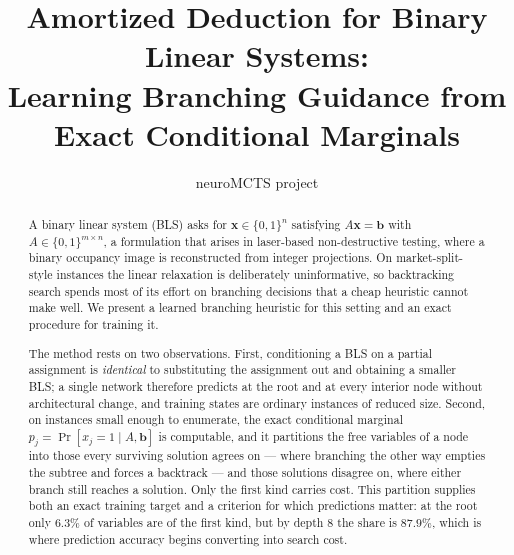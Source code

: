 \documentclass[preprint,12pt]{elsarticle}
\begin{document}
\begin{frontmatter}

\title{Amortized Deduction for Binary Linear Systems:\\
Learning Branching Guidance from Exact Conditional Marginals}

\author[1]{neuroMCTS project}

\begin{abstract}
A binary linear system (BLS) asks for $\mathbf{x}\in\{0,1\}^n$ satisfying $A\mathbf{x}=\mathbf{b}$ with $A\in\{0,1\}^{m\times n}$, a formulation that arises in laser-based non-destructive testing, where a binary occupancy image is reconstructed from integer projections. On market-split-style instances the linear relaxation is deliberately uninformative, so backtracking search spends most of its effort on branching decisions that a cheap heuristic cannot make well. We present a learned branching heuristic for this setting and an exact procedure for training it.

The method rests on two observations. First, conditioning a BLS on a partial assignment is \emph{identical} to substituting the assignment out and obtaining a smaller BLS; a single network therefore predicts at the root and at every interior node without architectural change, and training states are ordinary instances of reduced size. Second, on instances small enough to enumerate, the exact conditional marginal $p_j=\Pr[x_j=1\mid A,\mathbf{b}]$ is computable, and it partitions the free variables of a node into those every surviving solution agrees on --- where branching the other way empties the subtree and forces a backtrack --- and those solutions disagree on, where either branch still reaches a solution. Only the first kind carries cost. This partition supplies both an exact training target and a criterion for which predictions matter: at the root only $6.3\%$ of variables are of the first kind, but by depth $8$ the share is $87.9\%$, which is where prediction accuracy begins converting into search cost.


\end{abstract}
\end{frontmatter}
\end{document}
